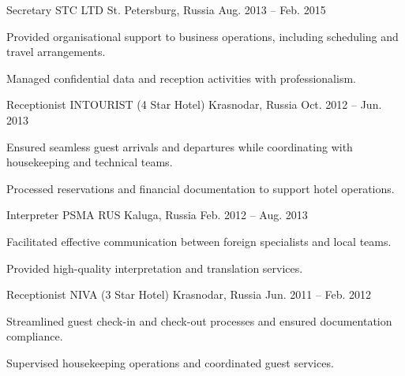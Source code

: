 \begin{cventries}
  \cventry
    {Secretary} %
    {STC LTD} %
    {St. Petersburg, Russia} %
    {Aug. 2013 -- Feb. 2015} %
    {
      \begin{cvitems} %
        \item {Provided organisational support to business operations, including scheduling and travel arrangements.}
        \item {Managed confidential data and reception activities with professionalism.}
      \end{cvitems}
    }

  \cventry
    {Receptionist} %
    {INTOURIST (4 Star Hotel)} %
    {Krasnodar, Russia} %
    {Oct. 2012 -- Jun. 2013} %
    {
      \begin{cvitems} %
        \item {Ensured seamless guest arrivals and departures while coordinating with housekeeping and technical teams.}
        \item {Processed reservations and financial documentation to support hotel operations.}
      \end{cvitems}
    }

  \cventry
    {Interpreter} %
    {PSMA RUS} %
    {Kaluga, Russia} %
    {Feb. 2012 -- Aug. 2013} %
    {
      \begin{cvitems} %
        \item {Facilitated effective communication between foreign specialists and local teams.}
        \item {Provided high-quality interpretation and translation services.}
      \end{cvitems}
    }

  \cventry
    {Receptionist} %
    {NIVA (3 Star Hotel)} %
    {Krasnodar, Russia} %
    {Jun. 2011 -- Feb. 2012} %
    {
      \begin{cvitems} %
        \item {Streamlined guest check-in and check-out processes and ensured documentation compliance.}
        \item {Supervised housekeeping operations and coordinated guest services.}
      \end{cvitems}
    }

\end{cventries}
